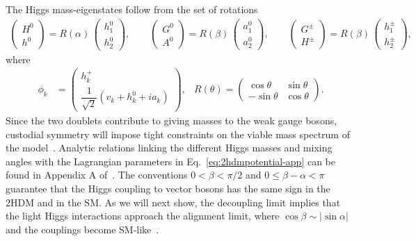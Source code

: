 The Higgs mass-eigenstates follow from the set of rotations
%
\begin{align}
\begin{pmatrix} H^0 \\ h^0 \end{pmatrix} = R(\alpha)\,\begin{pmatrix} h^0_1 \\ h^0_2 \end{pmatrix},
\qquad
\begin{pmatrix} G^0 \\ A^0 \end{pmatrix} = R(\beta)\,\begin{pmatrix} a^0_1 \\ a^0_2 \end{pmatrix},
\qquad
\begin{pmatrix} G^\pm \\ H^\pm \end{pmatrix} = R(\beta)\,\begin{pmatrix} h^\pm_1 \\ h^\pm_2 \end{pmatrix} ,
\end{align}
%
where
\begin{align}
\phi_k &= \begin{pmatrix} h_k^+ \\[1mm] \dfrac{1}{\sqrt{2}} (v_k + h_k^0 + i a_k)
         \end{pmatrix}, &
R(\theta) = \begin{pmatrix} \cos\theta & \sin\theta \\
			-\sin\theta & \cos\theta \end{pmatrix}.
\end{align}
%
Since the two doublets contribute to giving masses to the weak gauge
bosons, custodial symmetry will impose tight constraints on the viable
mass spectrum of the model~\cite{Veltman:1976rt,oblique-2hdm}.
Analytic relations linking the different Higgs masses and mixing
angles with the Lagrangian parameters in Eq.~\eqref{eq:2hdmpotential-app}
can be found \eg in Appendix A of~\cite{Lopez-Val:2013yba}.
The conventions $0 <\beta < \pi/2 $ 
and $0 \leq \beta-\alpha
< \pi$ guarantee that the Higgs coupling to
vector bosons has the same sign in the 2HDM and in the SM.
As we will next show, 
the decoupling limit implies that the light Higgs
interactions approach the alignment limit, where $\cos\beta \sim
|\sin\alpha|$ and the couplings become SM-like~\cite{Gunion:2002zf}.
\medskip

